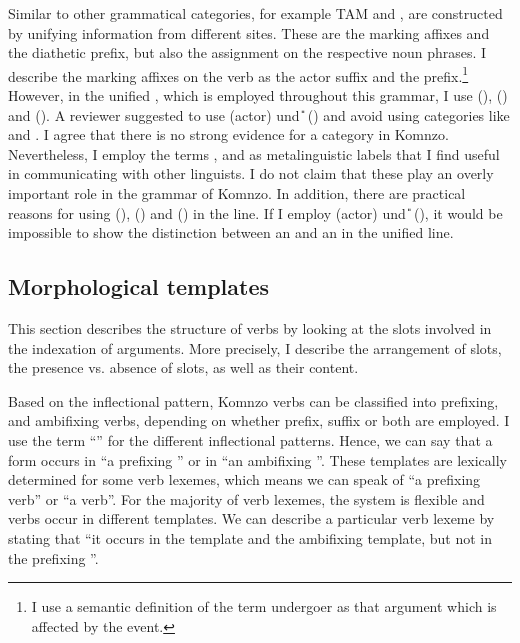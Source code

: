 Similar to other grammatical categories, for example TAM and ,  are constructed by unifying information from different sites. These are the  marking affixes and the diathetic prefix, but also the  assignment on the respective noun phrases. I describe the  marking affixes on the verb as the actor suffix and the  prefix.\footnote{I use a semantic definition of the term undergoer as that argument which is affected by the event.} However, in the unified , which is employed throughout this grammar, I use \Sbj{} (), \Obj{} () and \Io{} (). A reviewer suggested to use \A{} (actor) und \U{} () and avoid using categories like  and . I agree that there is no strong evidence for a  category in Komnzo. Nevertheless, I employ the terms ,  and  as metalinguistic labels that I find useful in communicating with other linguists. I do not claim that these play an overly important role in the grammar of Komnzo. In addition, there are practical reasons for using \Sbj{} (), \Obj{} () and \Io{} () in the  line. If I employ \A{} (actor) und \U{} (), it would be impossible to show the distinction between an  and an  in the unified  line.

\subsection{Morphological templates}\label{morphologicaltemplates}

This section describes the structure of verbs by looking at the slots involved in the indexation of arguments. More precisely, I describe the arrangement of slots, the presence vs. absence of slots, as well as their content.%

Based on the inflectional pattern, Komnzo verbs can be classified into prefixing,  and ambifixing verbs, depending on whether prefix, suffix or both are employed. I use the term ``'' for the different inflectional patterns. Hence, we can say that a  form occurs in ``a prefixing '' or in ``an ambifixing ''. These templates are lexically determined for some verb lexemes, which means we can speak of ``a prefixing verb'' or ``a  verb''. For the majority of verb lexemes, the system is flexible and verbs occur in different templates. We can describe a particular verb lexeme by stating that ``it occurs in the  template and the ambifixing template, but not in the prefixing ''.%

